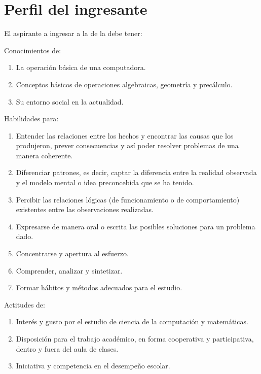 \section{Perfil del ingresante}

El aspirante a ingresar a la \SchoolFullName de la \University debe tener:

\noindent Conocimientos de:
\begin{enumerate}
\item La operación básica de una computadora.
\item Conceptos básicos de operaciones algebraicas, geometría y precálculo.
\item Su entorno social en la actualidad.
\end{enumerate}

\noindent Habilidades para:
\begin{enumerate}
\item Entender las relaciones entre los hechos y encontrar las causas que los produjeron, prever consecuencias y así poder resolver problemas de una manera coherente.
\item Diferenciar patrones, es decir, captar la diferencia entre la realidad observada y el modelo mental o idea preconcebida que se ha tenido.
\item Percibir las relaciones lógicas (de funcionamiento o de comportamiento) existentes entre las observaciones realizadas.
\item Expresarse de manera oral o escrita las posibles soluciones para un problema dado.
\item Concentrarse y apertura al esfuerzo.
\item Comprender, analizar y sintetizar.
\item Formar hábitos y métodos adecuados para el estudio.
\end{enumerate}

\noindent Actitudes de:
\begin{enumerate}
\item Interés y gusto por el estudio de ciencia de la computación y matemáticas.
\item Disposición para el trabajo académico, en forma cooperativa y participativa, dentro y fuera del aula de clases.
\item Iniciativa y competencia en el desempeño escolar.
\end{enumerate}
